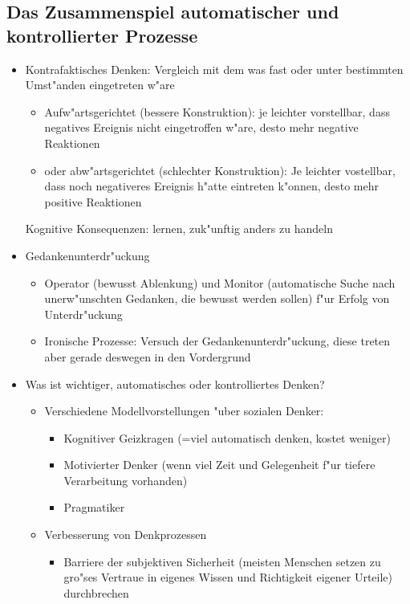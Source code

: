 \subsection{Das Zusammenspiel automatischer und kontrollierter Prozesse}
\begin{itemize}
	\item
		Kontrafaktisches Denken: Vergleich mit dem was fast oder unter bestimmten Umst"anden eingetreten w"are
		\begin{itemize}
			\item
				Aufw"artsgerichtet (bessere Konstruktion): je leichter vorstellbar, dass negatives Ereignis nicht eingetroffen w"are, desto mehr negative Reaktionen 
			\item oder abw"artsgerichtet (schlechter Konstruktion): Je leichter vostellbar, dass noch negativeres Ereignis h"atte eintreten k"onnen, desto mehr positive Reaktionen
		\end{itemize}
		Kognitive Konsequenzen: lernen, zuk"unftig anders zu handeln

	\item
		Gedankenunterdr"uckung
		\begin{itemize}
			\item
				Operator (bewusst Ablenkung) und Monitor (automatische Suche nach unerw"unschten Gedanken, die bewusst werden sollen) f"ur Erfolg von Unterdr"uckung
	\item
		Ironische Prozesse: Versuch der Gedankenunterdr"uckung, diese treten aber gerade deswegen in den Vordergrund
		\end{itemize}
	\item
		Was ist wichtiger, automatisches oder kontrolliertes Denken?
		\begin{itemize}
			\item
				Verschiedene Modellvorstellungen "uber sozialen Denker:
				\begin{itemize}
					\item
						Kognitiver Geizkragen (=viel automatisch denken, kostet weniger)
					\item
						Motivierter Denker (wenn viel Zeit und Gelegenheit f"ur tiefere Verarbeitung vorhanden)
					\item
						Pragmatiker
				\end{itemize}
			\item
				Verbesserung von Denkprozessen
				\begin{itemize}
					\item
						Barriere der subjektiven Sicherheit (meisten Menschen setzen zu gro"ses Vertraue in eigenes Wissen und Richtigkeit eigener Urteile) durchbrechen
				\end{itemize}
		\end{itemize}
\end{itemize}

